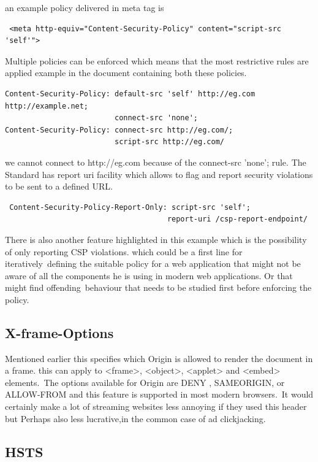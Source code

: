 an example policy delivered in meta tag is 
\begin{verbatim}
 <meta http-equiv="Content-Security-Policy" content="script-src 'self'">
\end{verbatim}

Multiple policies can be enforced which means that the most restrictive rules are applied example in the document containing both these policies.\
\begin{verbatim}
Content-Security-Policy: default-src 'self' http://eg.com http://example.net;
                         connect-src 'none';
Content-Security-Policy: connect-src http://eg.com/;
                         script-src http://eg.com/
\end{verbatim}

we cannot connect to http://eg.com because of the connect-src 'none'; rule.
The Standard has report uri facility which allows to flag and report security violations to be sent to a defined URL.

\begin{verbatim}
 Content-Security-Policy-Report-Only: script-src 'self';
                                     report-uri /csp-report-endpoint/
\end{verbatim}

There is also another feature highlighted in this example which is the possibility of only reporting CSP violations. which could be a first line for iteratively\
defining the suitable policy for a web application that might not be aware of all the components he is using in modern web applications. Or that might find offending\
behaviour that needs to be studied first before enforcing the policy.\\


\subsection{X-frame-Options}
\label{X-frame-Options}
Mentioned earlier this specifies which Origin is allowed to render the document in a frame. this can apply to <frame>, <object>, <applet> and <embed> elements.\
The options available for Origin are DENY , SAMEORIGIN, or ALLOW-FROM and this feature is supported in most modern browsers.\
It would certainly make a lot of streaming websites less annoying if they used this header but Perhaps also less lucrative,in the common case of ad clickjacking.\

\subsection{HSTS}

